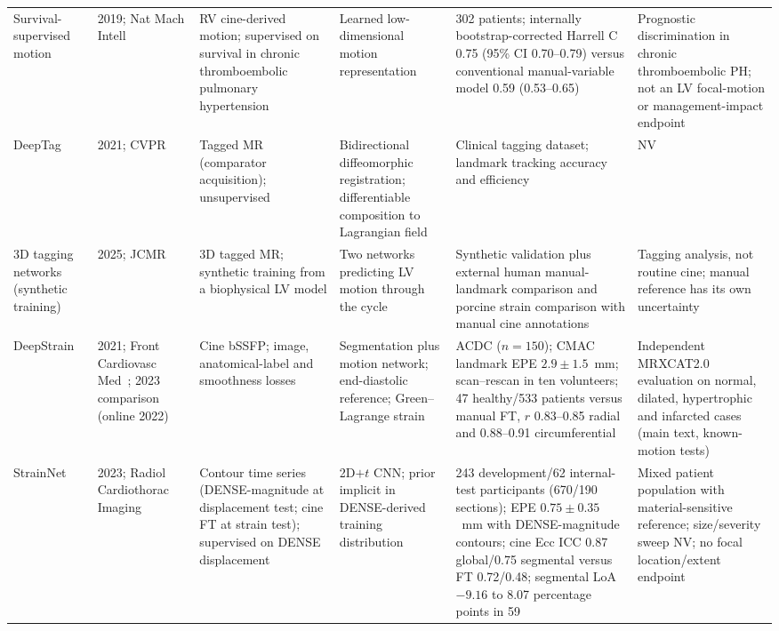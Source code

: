\documentclass[11pt,a4paper]{article}
\begin{document}
{\begin{longtable}{L{0.11\textwidth}L{0.115\textwidth}L{0.16\textwidth}L{0.185\textwidth}L{0.205\textwidth}L{0.165\textwidth}}
\addlinespace
Survival-supervised motion & 2019; Nat Mach Intell~\cite{bello2019} & RV cine-derived motion; supervised on survival in chronic thromboembolic pulmonary hypertension & Learned low-dimensional motion representation & 302 patients; internally bootstrap-corrected Harrell C 0.75 (95\% CI 0.70--0.79) versus conventional manual-variable model 0.59 (0.53--0.65) & Prognostic discrimination in chronic thromboembolic PH; not an LV focal-motion or management-impact endpoint \\
\addlinespace
DeepTag & 2021; CVPR~\cite{ye2021deeptag} & Tagged MR (comparator acquisition); unsupervised & Bidirectional diffeomorphic registration; differentiable composition to Lagrangian field & Clinical tagging dataset; landmark tracking accuracy and efficiency & NV \\
\addlinespace
3D tagging networks (synthetic training) & 2025; JCMR~\cite{buoso2025tagging3d} & 3D tagged MR; synthetic training from a biophysical LV model & Two networks predicting LV motion through the cycle & Synthetic validation plus external human manual-landmark comparison and porcine strain comparison with manual cine annotations & Tagging analysis, not routine cine; manual reference has its own uncertainty \\
\addlinespace
DeepStrain & 2021; Front Cardiovasc Med~\cite{morales2021}; 2023 com\-parison (online 2022)~\cite{morales2022comparison} & Cine bSSFP; image, anatomical-label and smoothness losses & Segmentation plus motion network; end-diastolic reference; Green--Lagrange strain & ACDC (\(n=150\)); CMAC landmark EPE \(2.9\pm1.5\)~mm; scan--rescan in ten volunteers; 47 healthy/533 patients versus manual FT, \(r\) 0.83--0.85 radial and 0.88--0.91 circumferential & Independent MRXCAT2.0 evaluation on normal, dilated, hypertrophic and infarcted cases (main text, known-motion tests) \\
\addlinespace
StrainNet & 2023; Radiol Cardiothorac Imaging~\cite{wang2023strainnet} & Contour time series (DENSE-magnitude at displacement test; cine FT at strain test); supervised on DENSE displacement & 2D\(+t\) CNN; prior implicit in DENSE-derived training distribution & 243 development/62 internal-test participants (670/190 sections); EPE \(0.75\pm0.35\)~mm with DENSE-magnitude contours; cine Ecc ICC 0.87 global/0.75 segmental versus FT 0.72/0.48; segmental LoA \(-9.16\) to 8.07 percentage points in 59 & Mixed patient population with material-sensitive reference; size/severity sweep NV; no focal location/extent endpoint \\

\end{longtable}}
\end{document}
